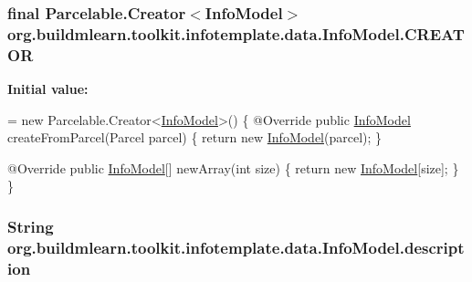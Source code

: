 \subsubsection[{\texorpdfstring{C\+R\+E\+A\+T\+OR}{CREATOR}}]{\setlength{\rightskip}{0pt plus 5cm}final Parcelable.\+Creator$<${\bf Info\+Model}$>$ org.\+buildmlearn.\+toolkit.\+infotemplate.\+data.\+Info\+Model.\+C\+R\+E\+A\+T\+OR\hspace{0.3cm}{\ttfamily [static]}}\hypertarget{classorg_1_1buildmlearn_1_1toolkit_1_1infotemplate_1_1data_1_1InfoModel_abcf0c8ceb2e2c7f7071cf9ef5a73a134}{}\label{classorg_1_1buildmlearn_1_1toolkit_1_1infotemplate_1_1data_1_1InfoModel_abcf0c8ceb2e2c7f7071cf9ef5a73a134}
{\bfseries Initial value\+:}
\begin{DoxyCode}
= \textcolor{keyword}{new} Parcelable.Creator<\hyperlink{classorg_1_1buildmlearn_1_1toolkit_1_1infotemplate_1_1data_1_1InfoModel_ada5c0847e2335624f4cfc9253e21b064}{InfoModel}>() \{
        @Override
        \textcolor{keyword}{public} \hyperlink{classorg_1_1buildmlearn_1_1toolkit_1_1infotemplate_1_1data_1_1InfoModel_ada5c0847e2335624f4cfc9253e21b064}{InfoModel} createFromParcel(Parcel parcel) \{
            \textcolor{keywordflow}{return} \textcolor{keyword}{new} \hyperlink{classorg_1_1buildmlearn_1_1toolkit_1_1infotemplate_1_1data_1_1InfoModel_ada5c0847e2335624f4cfc9253e21b064}{InfoModel}(parcel);
        \}

        @Override
        \textcolor{keyword}{public} \hyperlink{classorg_1_1buildmlearn_1_1toolkit_1_1infotemplate_1_1data_1_1InfoModel_ada5c0847e2335624f4cfc9253e21b064}{InfoModel}[] newArray(\textcolor{keywordtype}{int} size) \{
            \textcolor{keywordflow}{return} \textcolor{keyword}{new} \hyperlink{classorg_1_1buildmlearn_1_1toolkit_1_1infotemplate_1_1data_1_1InfoModel_ada5c0847e2335624f4cfc9253e21b064}{InfoModel}[size];
        \}
    \}
\end{DoxyCode}
\subsubsection[{\texorpdfstring{description}{description}}]{\setlength{\rightskip}{0pt plus 5cm}String org.\+buildmlearn.\+toolkit.\+infotemplate.\+data.\+Info\+Model.\+description\hspace{0.3cm}{\ttfamily [private]}}\hypertarget{classorg_1_1buildmlearn_1_1toolkit_1_1infotemplate_1_1data_1_1InfoModel_af89990104f985165d5bd428137c76ea0}{}\label{classorg_1_1buildmlearn_1_1toolkit_1_1infotemplate_1_1data_1_1InfoModel_af89990104f985165d5bd428137c76ea0}
